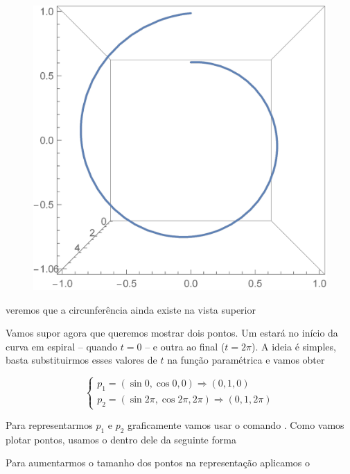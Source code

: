 \documentclass[a4paper, 12pt]{article}
\begin{document}
\newpage
\begin{figure}[!h]
	\centering
	\includegraphics[scale=.5]{images/ParametricPlot3DTopView}
\end{figure}

veremos que a circunferência ainda existe na vista superior

Vamos supor agora que queremos mostrar dois pontos. Um estará no início da curva em espiral -- quando $t=0$ -- e outra ao final ($t=2\pi$). A ideia é simples, basta substituirmos esses valores de $t$ na função paramétrica e vamos obter

$$
\begin{cases}
	p_{1} = (\sin 0,\cos 0,0) \Rightarrow (0,1,0)\\
	p_{2} = (\sin 2\pi,\cos 2\pi, 2\pi) \Rightarrow (0,1,2\pi)
\end{cases}
$$

Para representarmos $p_{1}$ e $p_{2}$ graficamente vamos usar o comando . Como vamos plotar pontos, usamos o  dentro dele da seguinte forma 

\begin{center}
\end{center}

Para aumentarmos o tamanho dos pontos na representação aplicamos o 
\end{document}
